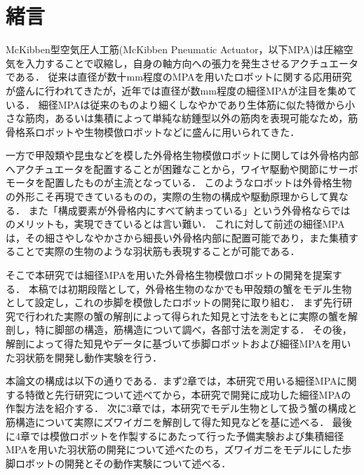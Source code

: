 \newpage
\setcounter{page}{1}
\section{緒言}
McKibben型空気圧人工筋(McKibben Pneumatic Actuator，以下MPA)は圧縮空気を入力することで収縮し，自身の軸方向への張力を発生させるアクチュエータである\cite{2003722}．
従来は直径が数十mm程度のMPAを用いたロボットに関する応用研究が盛んに行われてきたが，近年では直径が数mm程度の細径MPAが注目を集めている\cite{wakimoto}．
細径MPAは従来のものより細くしなやかであり生体筋に似た特徴から小さな筋肉，あるいは集積によって単純な紡錘型以外の筋肉を表現可能なため，筋骨格系ロボットや生物模倣ロボットなどに盛んに用いられてきた\cite{森田隆介2016}\cite{森和也2014}．

一方で甲殻類や昆虫などを模した外骨格生物模倣ロボットに関しては外骨格内部へアクチュエータを配置することが困難なことから，ワイヤ駆動や関節にサーボモータを配置したもの\cite{jmse10121804}が主流となっている．
このようなロボットは外骨格生物の外形こそ再現できているものの，実際の生物の構成や駆動原理からして異なる．
また「構成要素が外骨格内にすべて納まっている」という外骨格ならではのメリットも，実現できているとは言い難い．
これに対して前述の細径MPAは，その細さやしなやかさから細長い外骨格内部に配置可能であり，また集積することで実際の生物のような羽状筋も表現することが可能である\cite{2003}．

そこで本研究では細径MPAを用いた外骨格生物模倣ロボットの開発を提案する．
本稿では初期段階として，外骨格生物のなかでも甲殻類の蟹をモデル生物として設定し，これの歩脚を模倣したロボットの開発に取り組む．
まず先行研究で行われた実際の蟹の解剖によって得られた知見と寸法をもとに実際の蟹を解剖し，特に脚部の構造，筋構造について調べ，各部寸法を測定する．
その後，解剖によって得た知見やデータに基づいて歩脚ロボットおよび細径MPAを用いた羽状筋を開発し動作実験を行う．

本論文の構成は以下の通りである．まず2章では，本研究で用いる細径MPAに関する特徴と先行研究について述べてから，本研究で開発に成功した細径MPAの作製方法を紹介する．
次に3章では，本研究でモデル生物として扱う蟹の構成と筋構造について実際にズワイガニを解剖して得た知見などを基に述べる．
最後に4章では模倣ロボットを作製するにあたって行った予備実験および集積細径MPAを用いた羽状筋の開発について述べたのち，ズワイガニをモデルにした歩脚ロボットの開発とその動作実験について述べる．

